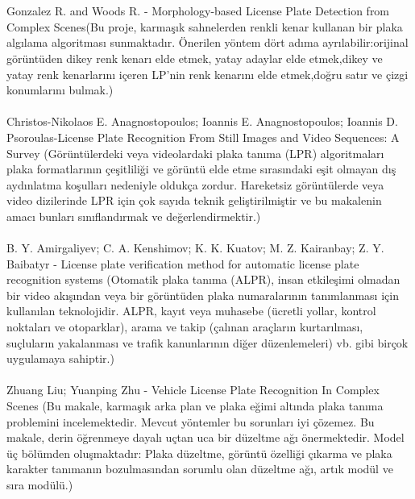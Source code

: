 \\ \\
Gonzalez R. and Woods R. - Morphology-based
License Plate Detection from Complex Scenes(Bu proje, karmaşık sahnelerden renkli kenar kullanan bir plaka algılama algoritması sunmaktadır. Önerilen yöntem dört adıma ayrılabilir:orijinal görüntüden dikey renk kenarı elde etmek, yatay adaylar elde etmek,dikey ve yatay renk kenarlarını içeren LP'nin renk kenarını elde etmek,doğru satır ve çizgi konumlarını bulmak.)
\\ \\
Christos-Nikolaos E. Anagnostopoulos; Ioannis E. Anagnostopoulos; Ioannis D. Psoroulas-License Plate Recognition From Still Images and Video Sequences: A Survey (Görüntülerdeki veya videolardaki plaka tanıma (LPR) algoritmaları plaka formatlarının çeşitliliği ve görüntü elde etme sırasındaki eşit olmayan dış aydınlatma koşulları nedeniyle oldukça zordur. Hareketsiz görüntülerde veya video dizilerinde LPR için çok sayıda teknik geliştirilmiştir ve bu makalenin amacı bunları sınıflandırmak ve değerlendirmektir.)
\\ \\
B. Y. Amirgaliyev; C. A. Kenshimov; K. K. Kuatov; M. Z. Kairanbay; Z. Y. Baibatyr - License plate verification method for automatic license plate recognition systems (Otomatik plaka tanıma (ALPR), insan etkileşimi olmadan bir video akışından veya bir görüntüden plaka numaralarının tanımlanması için kullanılan teknolojidir. ALPR, kayıt veya muhasebe (ücretli yollar, kontrol noktaları ve otoparklar), arama ve takip (çalınan araçların kurtarılması, suçluların yakalanması ve trafik kanunlarının diğer düzenlemeleri) vb. gibi birçok uygulamaya sahiptir.)
\\ \\
Zhuang Liu; Yuanping Zhu - Vehicle License Plate Recognition In Complex Scenes (Bu makale, karmaşık arka plan ve plaka eğimi altında plaka tanıma problemini incelemektedir. Mevcut yöntemler bu sorunları iyi çözemez. Bu makale, derin öğrenmeye dayalı uçtan uca bir düzeltme ağı önermektedir. Model üç bölümden oluşmaktadır: Plaka düzeltme, görüntü özelliği çıkarma ve plaka karakter tanımanın bozulmasından sorumlu olan düzeltme ağı, artık modül ve sıra modülü.)
 \\ \\
 



\newpage

